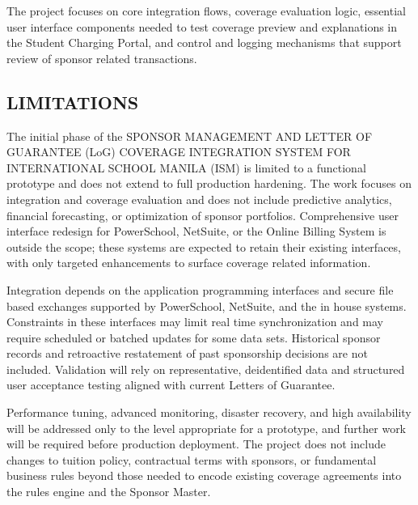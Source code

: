     The project focuses on core integration flows, coverage evaluation logic, essential user interface components needed to test coverage preview and explanations in the Student Charging Portal, and control and logging mechanisms that support review of sponsor related transactions.

\subsection{LIMITATIONS}

    The initial phase of the SPONSOR MANAGEMENT AND LETTER OF GUARANTEE (LoG) COVERAGE INTEGRATION SYSTEM FOR INTERNATIONAL SCHOOL MANILA (ISM) is limited to a functional prototype and does not extend to full production hardening. The work focuses on integration and coverage evaluation and does not include predictive analytics, financial forecasting, or optimization of sponsor portfolios. Comprehensive user interface redesign for PowerSchool, NetSuite, or the Online Billing System is outside the scope; these systems are expected to retain their existing interfaces, with only targeted enhancements to surface coverage related information.
    
    Integration depends on the application programming interfaces and secure file based exchanges supported by PowerSchool, NetSuite, and the in house systems. Constraints in these interfaces may limit real time synchronization and may require scheduled or batched updates for some data sets. Historical sponsor records and retroactive restatement of past sponsorship decisions are not included. Validation will rely on representative, deidentified data and structured user acceptance testing aligned with current Letters of Guarantee. 
    
    Performance tuning, advanced monitoring, disaster recovery, and high availability will be addressed only to the level appropriate for a prototype, and further work will be required before production deployment. The project does not include changes to tuition policy, contractual terms with sponsors, or fundamental business rules beyond those needed to encode existing coverage agreements into the rules engine and the Sponsor Master.
    